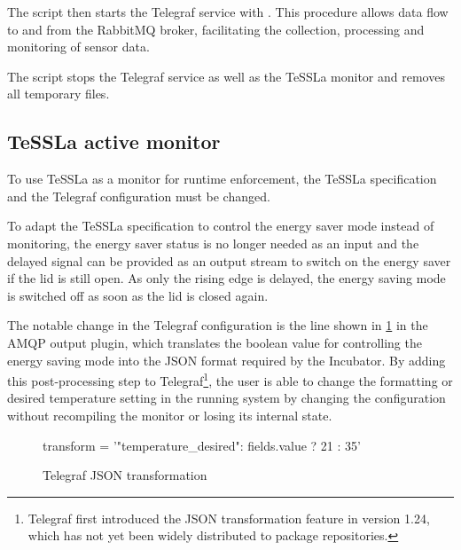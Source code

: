 %
The script then starts the Telegraf service with . This procedure allows data flow to and from the RabbitMQ broker, facilitating the collection, processing and monitoring of sensor data.

The  script stops the Telegraf service as well as the TeSSLa monitor and removes all temporary files.

\subsection{TeSSLa active monitor}\label{subsec:TESLA2}
To use TeSSLa as a monitor for runtime enforcement, the TeSSLa specification and the Telegraf configuration must be changed.

To adapt the TeSSLa specification to control the energy saver mode instead of monitoring, the energy saver status is no longer needed as an input and the delayed signal can be provided as an output stream to switch on the energy saver if the lid is still open. As only the rising edge is delayed, the energy saving mode is switched off as soon as the lid is closed again.

The notable change in the Telegraf configuration is the line shown in \cref{fig:telegraf_json_transformation} in the AMQP output plugin, which translates the boolean value for controlling the energy saving mode into the JSON format required by the Incubator.
By adding this post-processing step to Telegraf\footnote{
	Telegraf first introduced the JSON transformation feature in version 1.24, which has not yet been widely distributed to package repositories.
}, the user is able to change the formatting or desired temperature setting in the running system by changing the configuration without recompiling the monitor or losing its internal state.%
%
\begin{figure}[ht]
	\begin{textcode}
		transform = '{"temperature_desired": fields.value ? 21 : 35}'
	\end{textcode}
	\caption{Telegraf JSON transformation}
	\label{fig:telegraf_json_transformation}
\end{figure}%





